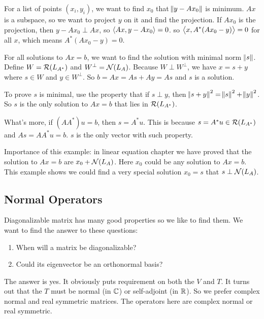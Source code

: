 \begin{example}
    For a list of points $(x_i, y_i)$, we want to find $x_0$ that $\norm{y - Ax_0}$ is minimum. $Ax$ is a subspace, so we want to project $y$ on it and find the projection. If $Ax_0$ is the projection, then $y - Ax_0 \perp Ax$, so $\left\langle \displaystyle Ax, y - Ax_0 \right\rangle = 0$. so $\left\langle \displaystyle x, A^* (Ax_0 - y) \right\rangle = 0$ for all $x$, which means $A^* (Ax_0 - y) = 0$.
\end{example}

\begin{example}
    For all solutions to $Ax=b$, we want to find the solution with minimal norm $\norm{s}$. Define $W = \mathcal{R}(L_{A^*})$ and $W^\perp = \mathcal{N}(L_A)$. Because $W \perp W^\perp$, we have $x = s + y$ where $s \in W$ and $y \in W^\perp$. So $b = Ax = As + Ay = As$ and $s$ is a solution.
    
    To prove $s$ is minimal, use the property that if $s \perp y$, then $\norm{s+y}^2 = \norm{s}^2 + \norm{y}^2$. So $s$ is the only solution to $Ax=b$ that lies in $\mathcal{R}(L_{A^*})$.
    
    What's more, if $(AA^*)u = b$, then $s = A^* u$. This is because $s = A^* u \in \mathcal{R}(L_{A^*})$ and $As = AA^*u = b$. $s$ is the only vector with such property.
    
    Importance of this example: in linear equation chapter we have proved that the solution to $Ax=b$ are $x_0 +  \mathcal{N}(L_A)$. Here $x_0$ could be any solution to $Ax=b$. This example shows we could find a very special solution $x_0 = s$ that $s \perp \mathcal{N}(L_A)$.
\end{example}




\subsection{Normal Operators}

Diagonalizable matrix has many good properties so we like to find them. We want to find the answer to these questions:
\begin{enumerate}
    \item When will a matrix be diagonalizable?
    \item Could its eigenvector be an orthonormal basis?
\end{enumerate}

The answer is yes. It obviously puts requirement on both the $V$ and $T$. It turns out that the $T$ must be normal (in $\mathbb{C}$) or self-adjoint (in $\mathbb{R}$). So we prefer complex normal and real symmetric matrices. The operators here are complex normal or real symmetric.

